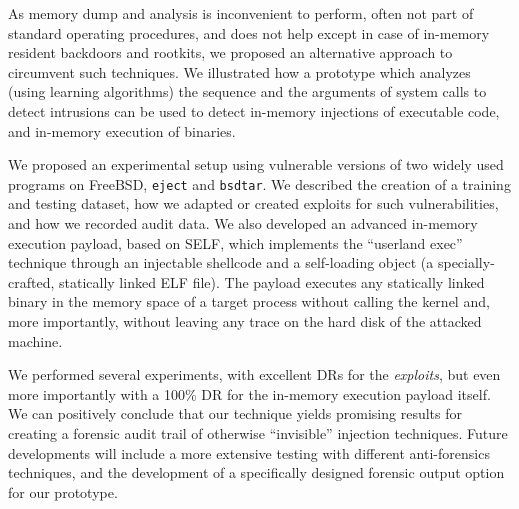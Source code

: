 As memory dump and analysis is inconvenient to perform, often not part of standard operating procedures, and does not help except in case of in-memory resident backdoors and rootkits, we proposed an alternative approach to circumvent such techniques. We illustrated how a prototype which analyzes (using learning algorithms) the sequence and the arguments of system calls to detect intrusions can be used to detect in-memory injections of executable code, and in-memory execution of binaries.

We proposed an experimental setup using vulnerable versions of two widely used programs on \textsf{FreeBSD}, \texttt{eject} and \texttt{bsdtar}. We described the creation of a training and testing dataset, how we adapted or created exploits for such vulnerabilities, and how we recorded audit data. We also developed an advanced in-memory execution payload, based on SELF, which implements the ``userland exec'' technique through an injectable shellcode and a self-loading object (a specially-crafted, statically linked \ac{ELF} file). The payload executes any statically linked binary in the memory space of a target process without calling the kernel and, more importantly, without leaving any trace on the hard disk of the attacked machine. 

We performed several experiments, with excellent \acp{DR} for the \emph{exploits}, but even more importantly with a 100\% \ac{DR} for the in-memory execution payload itself. We can positively conclude that our technique yields promising results for creating a forensic audit trail of otherwise ``invisible'' injection techniques. Future developments will include a more extensive testing with different anti-forensics techniques, and the development of a specifically designed forensic output option for our prototype.


